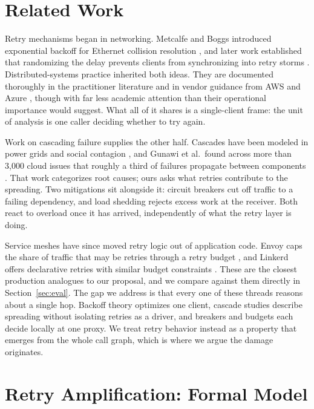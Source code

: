 \documentclass[conference]{IEEEtran}
\begin{document}
\section{Related Work}

Retry mechanisms began in networking. Metcalfe and Boggs introduced exponential backoff for Ethernet collision resolution \cite{metcalfe1976ethernet}, and later work established that randomizing the delay prevents clients from synchronizing into retry storms \cite{kleinrock1975packet}. Distributed-systems practice inherited both ideas. They are documented thoroughly in the practitioner literature \cite{nygard2007release, newman2015building, burns2018designing} and in vendor guidance from AWS and Azure \cite{aws_wellarchitected, azure_patterns}, though with far less academic attention than their operational importance would suggest. What all of it shares is a single-client frame: the unit of analysis is one caller deciding whether to try again.

Work on cascading failure supplies the other half. Cascades have been modeled in power grids \cite{dobson2007cascading} and social contagion \cite{watts2002cascades}, and Gunawi et al.\ found across more than 3,000 cloud issues that roughly a third of failures propagate between components \cite{gunawi2014cloud}. That work categorizes root causes; ours asks what retries contribute to the spreading. Two mitigations sit alongside it: circuit breakers \cite{nygard2007release} cut off traffic to a failing dependency, and load shedding \cite{welsh2003overload, zhou2018wechat} rejects excess work at the receiver. Both react to overload once it has arrived, independently of what the retry layer is doing.

Service meshes have since moved retry logic out of application code. Envoy caps the share of traffic that may be retries through a retry budget \cite{envoy_retry}, and Linkerd offers declarative retries with similar budget constraints \cite{linkerd_retry}. These are the closest production analogues to our proposal, and we compare against them directly in Section~\ref{sec:eval}. The gap we address is that every one of these threads reasons about a single hop. Backoff theory optimizes one client, cascade studies describe spreading without isolating retries as a driver, and breakers and budgets each decide locally at one proxy. We treat retry behavior instead as a property that emerges from the whole call graph, which is where we argue the damage originates.

\section{Retry Amplification: Formal Model}
\label{sec:model}
\end{document}
